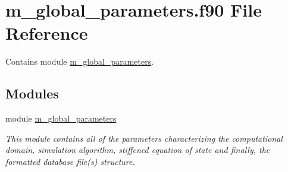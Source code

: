 \hypertarget{m__global__parameters_8f90}{}\section{m\+\_\+global\+\_\+parameters.\+f90 File Reference}
\label{m__global__parameters_8f90}


Contains module \hyperlink{namespacem__global__parameters}{m\+\_\+global\+\_\+parameters}.  


\subsection*{Modules}
\begin{DoxyCompactItemize}
\item 
module \hyperlink{namespacem__global__parameters}{m\+\_\+global\+\_\+parameters}
\begin{DoxyCompactList}\small\item\em This module contains all of the parameters characterizing the computational domain, simulation algorithm, stiffened equation of state and finally, the formatted database file(s) structure. \end{DoxyCompactList}\end{DoxyCompactItemize}
